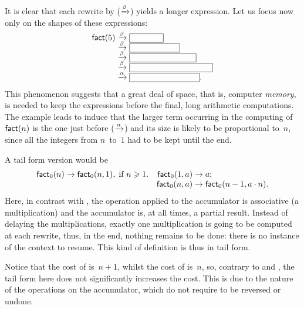 It is clear that each rewrite by (\(\xrightarrow{\smash[t]{\beta}}\))
yields a longer expression. Let us focus now only on the shapes of
these expressions:
\begin{equation*}
\setlength\fboxsep{0mm}
\begin{array}{r@{\;}c@{\;}l}
\fun{fact}(5)
& \smashedrightarrow{\beta} & \fbox{\phantom{$5 \cdot \fun{fact}(4)$}}\\
& \smashedrightarrow{\beta} & \fbox{\phantom{$5 \cdot (4 \cdot \fun{fact}(3))$}}\\
& \smashedrightarrow{\beta} & \fbox{\phantom{$5 \cdot (4 \cdot (3 \cdot \fun{fact}(2)))$}}\\
& \smashedrightarrow{\beta} & \fbox{\phantom{$5 \cdot (4 \cdot (3 \cdot (2 \cdot \fun{fact}(1))))$}}\\
& \smashedrightarrow{\alpha} & \fbox{\phantom{$5 \cdot (4 \cdot (3
    \cdot (2 \cdot (1))))$}}.
\end{array}
\end{equation*}
This phenomenon suggests that a great deal of space, that is, computer
\emph{memory}, is needed to keep the expressions before the final,
long arithmetic computations. The example leads to induce that the
larger term occurring in the computing of \(\textsf{fact}(n)\) is the one
just before (\(\xrightarrow{\smash[t]{\alpha}}\)) and its size is
likely to be proportional to~\(n\), since all the integers from
\(n\)~to~\(1\) had to be kept until the end.

A tail form version
 would be
\begin{equation*}
\begin{array}{@{}r@{\;}l@{\;}lr@{\;}l@{\;}l@{}}
\fun{fact}_0(n) & \rightarrow & \fun{fact}_0(n,1),
\;\text{if \(n \geqslant 1\)}. & \fun{fact}_0(1,a) & \rightarrow & a;\\
&&& \fun{fact}_0(n,a) & \rightarrow & \fun{fact}_0(n-1,a \cdot n).
\end{array}
\end{equation*}
Here, in contrast with , the operation applied to the
accumulator is associative (a multiplication) and the accumulator is,
at all times, a partial result. Instead of delaying the
multiplications, exactly one multiplication is going to be computed at
each rewrite, thus, in the end, nothing remains to be done: there is
no instance of the context to resume. This kind of definition is thus
in tail form.

Notice that the cost of  is~\(n+1\), whilst the cost
of  is~\(n\), so, contrary to  and
, the tail form here does not significantly increases the
cost. This is due to the nature of the operations on the accumulator,
which do not require to be reversed or undone.

